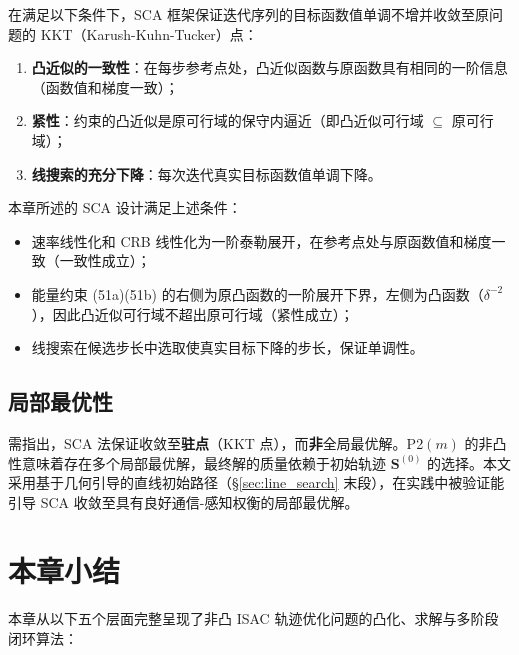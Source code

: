 在满足以下条件下，SCA 框架保证迭代序列的目标函数值单调不增并收敛至原问题的 KKT（Karush-Kuhn-Tucker）点\cite{Zeng2016}：

\begin{enumerate}
    \item \textbf{凸近似的一致性}：在每步参考点处，凸近似函数与原函数具有相同的一阶信息（函数值和梯度一致）；
    \item \textbf{紧性}：约束的凸近似是原可行域的保守内逼近（即凸近似可行域 $\subseteq$ 原可行域）；
    \item \textbf{线搜索的充分下降}：每次迭代真实目标函数值单调下降。
\end{enumerate}

本章所述的 SCA 设计满足上述条件：

\begin{itemize}
    \item 速率线性化和 CRB 线性化为一阶泰勒展开，在参考点处与原函数值和梯度一致（一致性成立）；
    \item 能量约束 (51a)(51b) 的右侧为原凸函数的一阶展开下界，左侧为凸函数（$\delta^{-2}$），因此凸近似可行域不超出原可行域（紧性成立）；
    \item 线搜索在候选步长中选取使真实目标下降的步长，保证单调性。
\end{itemize}

\subsection{局部最优性}

需指出，SCA 法保证收敛至\textbf{驻点}（KKT 点），而\textbf{非}全局最优解。P2$(m)$ 的非凸性意味着存在多个局部最优解，最终解的质量依赖于初始轨迹 $\mathbf{S}^{(0)}$ 的选择。本文采用基于几何引导的直线初始路径（\S\ref{sec:line_search} 末段），在实践中被验证能引导 SCA 收敛至具有良好通信-感知权衡的局部最优解。

\section{本章小结}
\label{sec:summary}

本章从以下五个层面完整呈现了非凸 ISAC 轨迹优化问题的凸化、求解与多阶段闭环算法：

